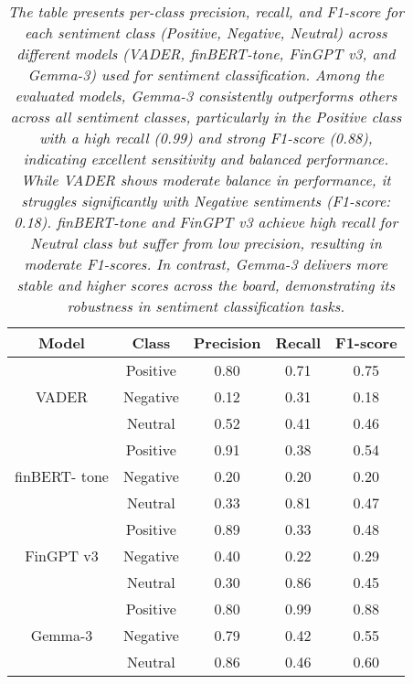 \begin{table}[h]
\centering
\begin{tabular}{|c|c|c|c|c|}
    \hline
    \textbf{Model} & \textbf{Class} & \textbf{Precision} & \textbf{Recall} & \textbf{F1-score} \\
    \hline
    \multirow{3}{*}{VADER} 
        & Positive & 0.80   &  0.71 & 0.75  \\
        & Negative & 0.12   & 0.31 & 0.18 \\
        & Neutral  & 0.52 & 0.41 & 0.46 \\
    \hline
    \multirow{3}{*}{finBERT- tone} 
        & Positive & 0.91 &  0.38  & 0.54 \\
        & Negative & 0.20 & 0.20 & 0.20 \\
        & Neutral  & 0.33  & 0.81 & 0.47 \\
    \hline
    \multirow{3}{*}{FinGPT v3} 
        & Positive & 0.89 & 0.33 & 0.48 \\
        & Negative & 0.40 & 0.22 & 0.29 \\
        & Neutral  & 0.30 & 0.86 & 0.45 \\
    \hline
    \multirow{3}{*}{Gemma-3} 
        & Positive & 0.80   &  0.99 & 0.88  \\
        & Negative & 0.79   & 0.42 & 0.55 \\
        & Neutral  & 0.86 & 0.46 & 0.60 \\

    \hline
\end{tabular}
\caption{\textit{The table presents per-class precision, recall, and F1-score for each sentiment class (Positive, Negative, Neutral) across different models (VADER, finBERT-tone, FinGPT v3, and Gemma-3) used for sentiment classification. Among the evaluated models, Gemma-3 consistently outperforms others across all sentiment classes, particularly in the Positive class with a high recall (0.99) and strong F1-score (0.88), indicating excellent sensitivity and balanced performance. While VADER shows moderate balance in performance, it struggles significantly with Negative sentiments (F1-score: 0.18). finBERT-tone and FinGPT v3 achieve high recall for Neutral class but suffer from low precision, resulting in moderate F1-scores. In contrast, Gemma-3 delivers more stable and higher scores across the board, demonstrating its robustness in sentiment classification tasks.}}
\label{tab:per_class_metrics}
\end{table}

